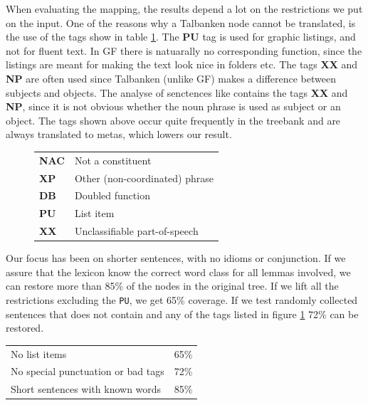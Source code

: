 \documentclass{report}
\begin{document}
When evaluating the mapping, the results depend a lot on the restrictions we
put on the input. 
One of the reasons why a Talbanken node cannot be translated, is the 
use of the tags show in table \ref{fig:mapBadtag}.
The \textbf{PU} tag is used for graphic listings, and not for fluent text.
In GF there is natuarally no corresponding function, since
the listings are meant for making the text look nice in
folders etc. The tags \textbf{XX} and \textbf{NP} are often used since
Talbanken (unlike GF) makes a difference between subjects
and objects. %
The analyse of senctences like
contains the tags \textbf{XX} and \textbf{NP}, since it is not obvious
whether the noun phrase is used as subject or an object.
The tags shown above occur quite frequently in the treebank and are always translated
to metas, which lowers our result. \\
\begin{figure}[h]
\begin{tabular}{ll}
\textbf{NAC} & Not a constituent\\
\textbf{XP} & Other (non-coordinated) phrase\\
\textbf{DB} & Doubled function\\
\textbf{PU} & List item\\
\textbf{XX} & Unclassifiable part-of-speech\\
\end{tabular}
\caption{}\label{fig:mapBadtag}
\end{figure}


Our focus has been on shorter sentences, with no idioms or conjunction.
If we assure that the lexicon know the correct word class for all lemmas
involved, we
can restore more than 85\% of the nodes in the original tree.
If we lift all the restrictions excluding the \verb|PU|, we get
65\% coverage.
If we test randomly collected sentences that does not contain and any of the tags listed
in figure \ref{fig:mapBadtag} 72\% can be restored. \\

\begin{tabular}{ll}
No list items & 65\%\\
No special punctuation or bad tags& 72\%\\
Short sentences with known words & 85\%\\
\end{tabular}
\end{document}
